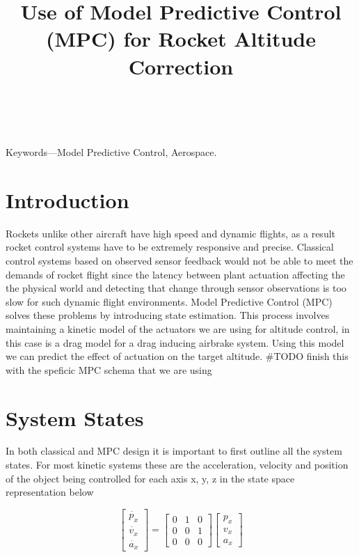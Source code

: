 \documentclass[conference, letterpaper]{IEEEtran}
\title{ Use of Model Predictive Control (MPC) for Rocket Altitude Correction }
\author{ \IEEEauthorblockN{Nikhil Peri, Anthony Lin, Manit Ginoya, Paul Buzuloiu } \
\IEEEauthorblockA{uOttawa Rocketry Team \\ \{nperi104, alin102
mgino015, pbuzu025\}@uottawa.ca} }
\begin{document}
\maketitle
\begin{abstract}
\end{abstract}

Keywords—Model Predictive Control, Aerospace.  \section{Introduction}

Rockets unlike other aircraft have high speed and dynamic flights, as a result
rocket control systems have to be extremely responsive and precise. Classical
control systems based on observed sensor feedback would not be able to meet the
demands of rocket flight since the latency between plant actuation affecting the
the physical world and detecting that change through sensor observations is too
slow for such dynamic flight environments. Model Predictive Control (MPC) solves
these problems by introducing state estimation.  This process involves maintaining
a kinetic model of the actuators we are using for altitude control, in this case
is a drag model for a drag inducing airbrake system. Using this model we can predict
the effect of actuation on the target altitude. #TODO finish this with the speficic MPC schema that we are using

\section{System States}
In both classical and MPC design it is important to first outline all the system states.
For most kinetic systems these are the acceleration, velocity and position of the object
being controlled for each axis x, y, z in the state space representation below

\begin{equation}
\begin{bmatrix}\dot{p_x}\\\dot{v_x}\\\dot{a_x}\end{bmatrix}=
\begin{bmatrix} 0 & 1 & 0 \\ 0 & 0 & 1 \\ 0 & 0 & 0 \end{bmatrix}
\begin{bmatrix}p_x\\v_x\\a_x\end{bmatrix}
\end{equation}
\end{document}
